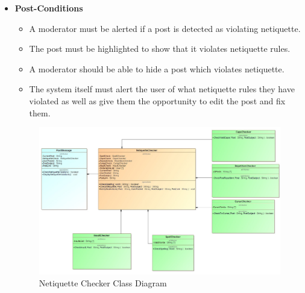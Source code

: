 \documentclass[11pt]{article}
\begin{document}
\begin{enumerate}
{\begin{itemize}
\begin{itemize}
\begin{itemize}
	  			\item Repetition of Asked Questions
	  			\item Checking all caps
	  			\item Curse word checking
	  			\item Checking for general insults
	  		\end{itemize}
	  		\item We will need a text file containing a large list of commonly used words for the spell checker.
	  		\item We will need a text file containing a large list of commonly used curse words.
			\item We will need a text file containing a large list of words commonly used with the intention of insulting someone.
  		\end{itemize}
  	\item	\textbf{Post-Conditions}
  		\begin{itemize}
	  		\item A moderator must be alerted if a post is detected as violating netiquette.
	  		\item The post must be highlighted to show that it violates netiquette rules.
	  		\item A moderator should be able to hide a post which violates netiquette.
	  		\item The system itself must alert the user of what netiquette rules they have violated as well as give them the opportunity to edit the post and fix them.
	  	\end{itemize}
	  		\begin{figure}[H]
	  			\caption{Netiquette Checker Class Diagram}
	  			\includegraphics[scale=0.35]{NetInputOutput.jpg}
	  		\end{figure}

\end{itemize}}
\end{enumerate}
\end{document}
